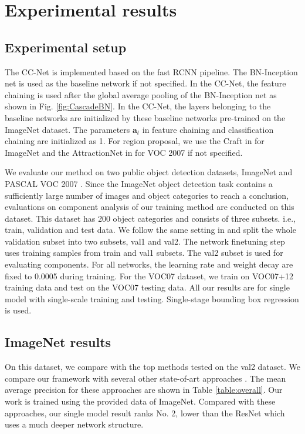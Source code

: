 \documentclass[10pt,twocolumn,letterpaper]{article}
\begin{document}
\section{Experimental results}
\subsection{Experimental setup}
The CC-Net is implemented based on the fast RCNN pipeline. The BN-Inception net is used as the baseline network if not specified.
In the CC-Net, the feature chaining is used after the global average pooling of the BN-Inception net \cite{ioffe2015batch} as shown in Fig. \ref{fig:CascadeBN}. In the CC-Net, the layers belonging to the baseline networks are initialized by these baseline networks pre-trained on the ImageNet dataset. The parameters $\mathbf{a}_t$ in feature chaining and classification chaining are initialized as 1. 
 For region proposal, we use the Craft in \cite{yang2016craft} for ImageNet and the AttractionNet in \cite{gidaris2016attend} for VOC 2007 if not specified. 

We evaluate our method on two public object detection datasets, ImageNet \cite{ILSVRC15} and PASCAL VOC 2007 \cite{Everingham:PacalVOC}. Since the ImageNet object detection task contains a sufficiently large number of images and object categories to reach a conclusion, evaluations on component analysis of our training method are conducted on this dataset. This dataset has 200 object categories and consists of three subsets. i.e., train, validation and test data. We follow the same setting in \cite{girshick2014rich} and split the whole validation subset into two subsets, val1 and val2.  The network finetuning step uses training samples from train and val1 subsets. The val2 subset is used for evaluating components. For all networks, the learning rate and weight decay are fixed to 0.0005 during training. For the VOC07 dataset, we train on VOC07+12 training data and test on the VOC07 testing data. All our results are for single model with single-scale training and testing. Single-stage bounding box regression is used.

\subsection{ImageNet results}
On this dataset, we compare with the top methods tested on the val2 dataset. We compare our framework with several other state-of-art approaches \cite{girshick2014rich,szegedy2015going,ioffe2015batch,ouyang2015deepid,yan2015object,he2016deep, zeng2016gated}. The mean average precision for these approaches are shown in Table \ref{table:overall}.  Our work is trained using the provided data of ImageNet.  Compared with these approaches, our single model result ranks No. 2, lower than the ResNet \cite{he2016deep} which uses a much deeper network structure. 
\end{document}

